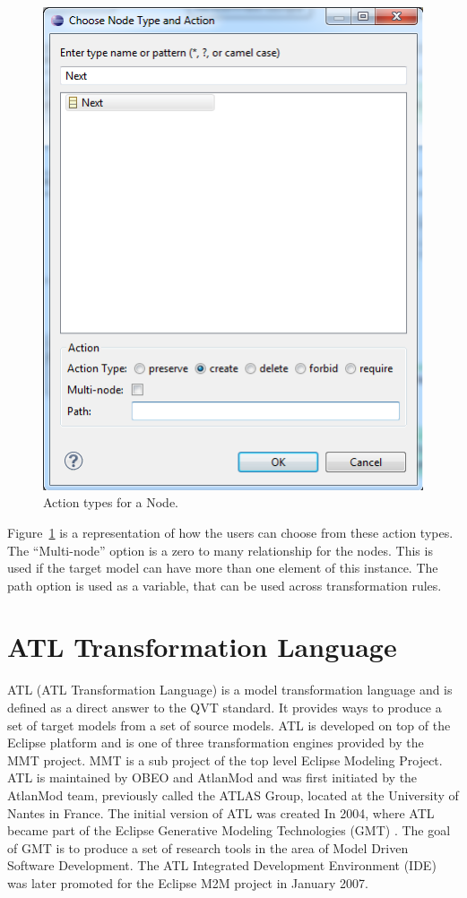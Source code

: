 \documentclass[pdftex,11pt,a4paper]{article}
\begin{document}
\begin{figure}[H]
	\centering
	\includegraphics[scale=0.5]{figures/Henshin_Action.png}
	\caption{Action types for a Node.}
	\label{fig:HenshinAction}
\end{figure}

Figure~\ref{fig:HenshinAction} is a representation of how the users can choose
from these action types. The ``Multi-node'' option is a zero to many
relationship for the nodes. This is used if the target model can have more than
one element of this instance. The path option is used as a variable, that can be
used across transformation rules. 

\section{ATL Transformation Language}

\noindent ATL\cite{ATL} (ATL Transformation Language) is a model transformation
language and is defined as a direct answer to the QVT\cite{QVT} standard. It
provides ways to produce a set of target models from a set of source models.
ATL is developed on top of the Eclipse platform and is one of three
transformation engines provided by the MMT project\cite{MMT}. MMT is a sub
project of the top level Eclipse Modeling Project\cite{EMP}. ATL is maintained
by OBEO\cite{OBEO} and AtlanMod\cite{ATLANMod} and was first initiated by the
AtlanMod team, previously called the ATLAS Group, located at the University of
Nantes in France. The initial version of ATL was created In 2004, where ATL
became part of the Eclipse Generative Modeling Technologies (GMT) \cite{GMT}.
The goal of GMT is to produce a set of research tools in the area of Model
Driven Software Development. The ATL Integrated Development Environment (IDE)
was later promoted for the Eclipse M2M project in January 2007.
\end{document}
